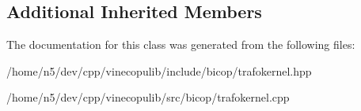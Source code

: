 \subsection*{Additional Inherited Members}


The documentation for this class was generated from the following files\+:\begin{DoxyCompactItemize}
\item 
/home/n5/dev/cpp/vinecopulib/include/bicop/trafokernel.\+hpp\item 
/home/n5/dev/cpp/vinecopulib/src/bicop/trafokernel.\+cpp\end{DoxyCompactItemize}
